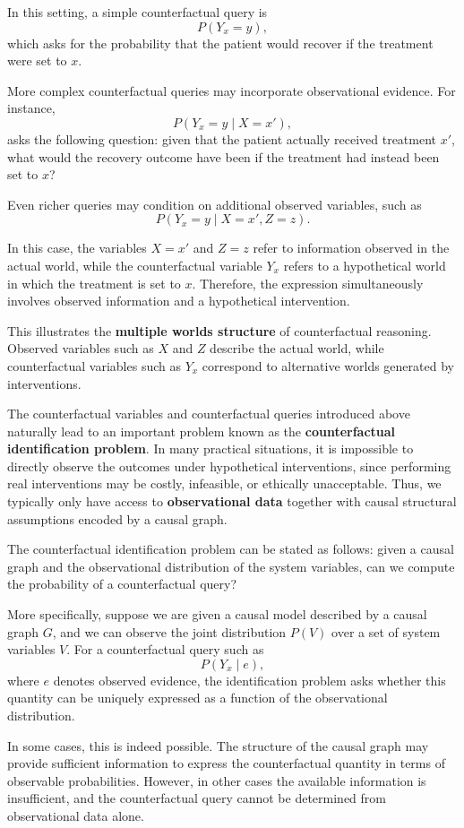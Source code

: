\documentclass[a4paper]{report}
\begin{document}
In this setting, a simple counterfactual query is
\[
P(Y_x = y),
\]
which asks for the probability that the patient would recover if the treatment were set to $x$.

More complex counterfactual queries may incorporate observational evidence. For instance,
\[
P(Y_x = y \mid X = x'),
\]
asks the following question: given that the patient actually received treatment $x'$, what would the recovery outcome have been if the treatment had instead been set to $x$?

Even richer queries may condition on additional observed variables, such as
\[
P(Y_x = y \mid X = x', Z = z).
\]

In this case, the variables $X = x'$ and $Z = z$ refer to information observed in the actual world, while the counterfactual variable $Y_x$ refers to a hypothetical world in which the treatment is set to $x$. Therefore, the expression simultaneously involves observed information and a hypothetical intervention.

This illustrates the \textbf{multiple worlds structure} of counterfactual reasoning. Observed variables such as $X$ and $Z$ describe the actual world, while counterfactual variables such as $Y_x$ correspond to alternative worlds generated by interventions.

The counterfactual variables and counterfactual queries introduced above naturally lead to an important problem known as the \textbf{counterfactual identification problem}. In many practical situations, it is impossible to directly observe the outcomes under hypothetical interventions, since performing real interventions may be costly, infeasible, or ethically unacceptable. Thus, we typically only have access to \textbf{observational data} together with causal structural assumptions encoded by a causal graph.

The counterfactual identification problem can be stated as follows: given a causal graph and the observational distribution of the system variables, can we compute the probability of a counterfactual query?

More specifically, suppose we are given a causal model described by a causal graph $G$, and we can observe the joint distribution $P(V)$ over a set of system variables $V$. 
For a counterfactual query such as
\[
P(Y_x \mid e),
\]
where $e$ denotes observed evidence, the identification problem asks whether this quantity can be uniquely expressed as a function of the observational distribution.

In some cases, this is indeed possible. The structure of the causal graph may provide sufficient information to express the counterfactual quantity in terms of observable probabilities. However, in other cases the available information is insufficient, and the counterfactual query cannot be determined from observational data alone.
\end{document}
